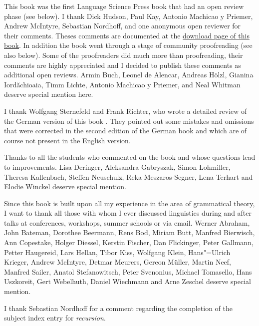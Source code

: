 This book was the first Language Science Press book that had an open review phase (see below). I
thank Dick Hudson, Paul Kay, Antonio Machicao y Priemer, Andrew McIntyre, Sebastian Nordhoff, and one anonymous open
reviewer for their comments. Theses comments are documented at the \href{\lsURL}{download page of
  this book}. In addition the book went through a stage of community proofreading (see also
below). Some of the proofreaders did much more than proofreading, their comments are highly
appreciated and I decided to publish these comments as additional open reviews.
Armin Buch, 
Leonel de Alencar,
Andreas Hölzl,
Gianina Iordăchioaia,
Timm Lichte,
Antonio Machicao y Priemer, and
Neal Whitman
deserve special mention here.


I thank Wolfgang Sternefeld and Frank Richter, who wrote a detailed review of the German version of
this book \citep{SR2012a}. They pointed out some mistakes and omissions that were corrected in the second edition
of the German book and which are of course not present in the English version.

Thanks to all the students who commented on the book and whose questions lead to improvements. 
Lisa Deringer,
Aleksandra Gabryszak, %
Simon Lohmiller, %
Theresa Kallenbach, %
Steffen Neu\-schulz,  %
Reka Meszaros-Segner,
Lena Terhart and
Elodie Winckel deserve special mention.

Since this book is built upon all my experience in the area of grammatical theory, I want to thank
all those with whom I ever discussed linguistics during and after talks at conferences, workshops,
summer schools or via email.
Werner Abraham,
John Bateman,
Dorothee Beermann, 
Rens Bod, 
Miriam Butt,
Manfred Bierwisch,
Ann Copestake, 
Holger Diessel, 
Kerstin Fischer,
Dan Flickinger,
Peter Gallmann, 
Petter Haugereid,
Lars Hellan, 
Tibor Kiss,
Wolfgang Klein, 
Hans"=Ulrich Krieger,
Andrew McIntyre,
Detmar Meurers,
Gereon Müller,
Martin Neef,
Manfred Sailer, 
Anatol Stefanowitsch,
Peter Svenonius,
Michael Tomasello, 
Hans Uszkoreit, 
Gert Webelhuth, 
Daniel Wiechmann and Arne Zeschel deserve special mention.

I thank Sebastian Nordhoff for a comment regarding the completion of the subject index entry for \emph{recursion}.

